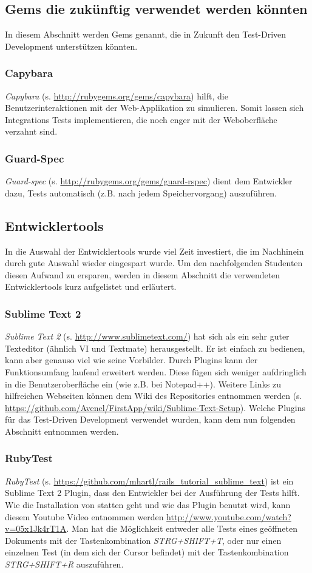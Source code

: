 \documentclass[12pt,             %
               a4paper,          %
               listof=totoc,     %
               index=totoc,      %
               bibliography=totoc,%
               oneside,         %
               BCOR1cm,          %
               english   %
               ]{scrbook}
\begin{document}
\subsection{Gems die zukünftig verwendet werden könnten}
In diesem Abschnitt werden Gems genannt, die in Zukunft den Test-Driven Development unterstützen könnten.
\subsubsection{Capybara}
\textit{Capybara} (s. \url{http://rubygems.org/gems/capybara}) hilft, die Benutzerinteraktionen mit der Web-Applikation zu simulieren. Somit lassen sich Integrations Tests implementieren, die noch enger mit der Weboberfläche verzahnt sind.

\subsubsection{Guard-Spec}
\textit{Guard-spec} (s. \url{http://rubygems.org/gems/guard-rspec}) dient dem Entwickler dazu, Tests automatisch (z.B. nach jedem Speichervorgang) auszuführen. 

\subsection{Entwicklertools}
In die Auswahl der Entwicklertools wurde viel Zeit investiert, die im Nachhinein durch gute Auswahl wieder eingespart wurde. Um den nachfolgenden Studenten diesen Aufwand zu ersparen, werden in diesem Abschnitt die verwendeten Entwicklertools kurz aufgelistet und erläutert. 

\subsubsection{Sublime Text 2}
\textit{Sublime Text 2} (s. \url{http://www.sublimetext.com/}) hat sich als ein sehr guter Texteditor (ähnlich VI und Textmate) herausgestellt. Er ist einfach zu bedienen, kann aber genauso viel wie seine Vorbilder. Durch Plugins kann der Funktionsumfang laufend erweitert werden. Diese fügen sich weniger aufdringlich in die Benutzeroberfläche ein (wie z.B. bei Notepad++). Weitere Links zu hilfreichen Webseiten können dem Wiki des Repositories entnommen werden (s. \url{https://github.com/Avenel/FirstApp/wiki/Sublime-Text-Setup}).
Welche Plugins für das Test-Driven Development verwendet wurden, kann dem nun folgenden Abschnitt entnommen werden. 

\subsubsection{RubyTest}
\textit{RubyTest} (s. \url{https://github.com/mhartl/rails_tutorial_sublime_text}) ist ein Sublime Text 2 Plugin, dass den Entwickler bei der Ausführung der Tests hilft. Wie die Installation von statten geht und wie das Plugin benutzt wird, kann diesem Youtube Video entnommen werden \url{http://www.youtube.com/watch?v=05x1Jk4rT1A}. Man hat die Möglichkeit entweder alle Tests eines geöffneten Dokuments mit der Tastenkombination \textit{STRG+SHIFT+T}, oder nur einen einzelnen Test (in dem sich der Cursor befindet) mit der Tastenkombination \textit{STRG+SHIFT+R} auszuführen.
\end{document}
